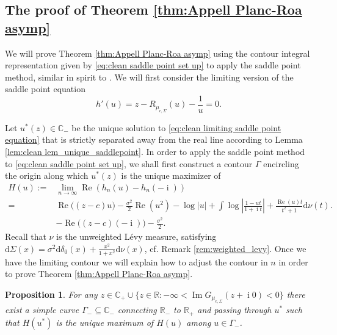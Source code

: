 \documentclass[reqno]{amsart}
\newcommand{\1}{\mathbf{1}}
\newcommand{\dd}{\mathrm{d}}
\DeclareMathOperator{\ii}{i}
\newcommand{\C}{\mathbb{C}}
\renewcommand\Re{\operatorname{Re}}
\renewcommand\Im{\operatorname{Im}}
\newcommand{\R}{\mathbb{R}}
\def\R{\mathbb{R}}
\theoremstyle{plain}
\newtheorem{proposition}[theorem]{Proposition}
\theoremstyle{definition}
\theoremstyle{remark}
\numberwithin{equation}{section}
\begin{document}
\subsection{The proof of Theorem \ref{thm:Appell Planc-Roa asymp}} We will prove Theorem \ref{thm:Appell Planc-Roa asymp} using the contour integral representation given by \eqref{eq:clean saddle point set up} to apply the saddle point method, similar in spirit to \cite{Hofert}. We will first consider the limiting version of the saddle point equation \begin{equation}\label{eq:clean limiting saddle point equation}
	h'(u)=z-R_{\mu_{c,\Sigma}}(u)-\frac{1}{u}=0.
\end{equation}%





Let $u^*(z)\in \C_-$ be the unique solution to \eqref{eq:clean limiting saddle point equation} that is strictly separated away from the real line according to Lemma \ref{lem:clean lem_unique_saddlepoint}. In order to apply the saddle point method to \eqref{eq:clean saddle point set up}, we shall first construct a contour $\Gamma$ encircling the origin along which $u^*(z)$ is the unique maximizer of 
\begin{align}
	H(u):=&
	\lim\limits_{n\rightarrow\infty}\Re\left( h_{n}(u)-h_n(-\ii)\right)\label{eq:H}\\
	=&\Re \big((z-c)u\big)-\frac{\sigma^2}{2}\Re(u^2)-\log|u|+\int\log\left|\frac{1-ut}{1+\ii t}\right|+\frac{\Re(u)t}{t^2+1}\dd\nu(t).\nonumber\\
	&-\Re \big((z-c)(-\ii)\big)-\frac{\sigma^2}{2}.\nonumber
\end{align} 
Recall that $\nu$ is the unweighted L\'evy measure, satisfying $\dd\Sigma(x)=\sigma^2\dd\delta_0(x)+\frac{x^2}{1+x^2}\dd\nu(x)$, cf. Remark \ref{rem:weighted_levy}. 
Once we have the limiting contour we will explain how to adjust the contour in $n$ in order to prove Theorem \ref{thm:Appell Planc-Roa asymp}.

 
\begin{proposition}\label{prop:Contour}
	For any $z\in\C_+\cup \{z\in\R: -\infty<\Im G_{\mu_{c,\Sigma}} (z+\ii0)<0\}$ there exist a simple curve $\Gamma_-\subseteq \C_-$ connecting $\R_-$ to $\R_+$ and passing through $u^*$ such that $H(u^*)$ is the unique maximum of $H(u)$ among $u\in\Gamma_-$.
\end{proposition}
\end{document}
